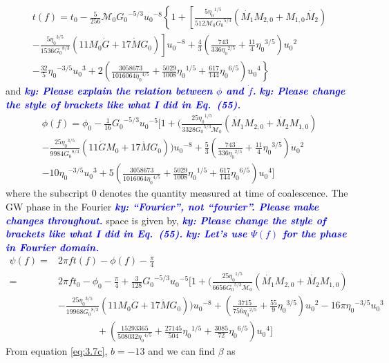 \documentclass[11pt]{article}
\newcommand{\ky}[1]{\textcolor{blue}{\it{\textbf{ky: #1}}} }
\begin{document}
\begin{align}
t(f)=t_0-\frac{5}{256}\mathcal{M}_0{G_0}^{-5/3}{u_0}^{-8}\left\{1+\left[\frac{5{\eta_0}^{1/5}}{512\mathcal{M}_0{G_0}^{5/3}}(\dot{M_1}M_{2,0}+M_{1,0}\dot{M_{2}}) \right. \right. \nonumber \\
\left. \left. -\frac{5{\eta_0}^{3/5}}{1536{G_0}^{8/3}}(11M_0\dot{G}+17\dot{M}G_0)\right]{u_0}^{-8}+\frac{4}{3}\left(\frac{743}{336{\eta_0}^{2/5}}+\frac{11}{4}{\eta_0}^{3/5} \right){u_0}^2 \right. \nonumber\\
\left. -\frac{32}{5}{\eta_0}^{-3/5}{u_0}^3+2 \left(\frac{3058673}{1016064{\eta_0}^{4/5}}+\frac{5029}{1008}{\eta_0}^{1/5}+\frac{617}{144}{\eta_0}^{6/5}\right){u_0}^4\right\}
\end{align}
and \ky{Please explain the relation between $\phi$ and $\dot f$.} \ky{Please change the style of brackets like what I did in Eq.~(55).}
\begin{align}
\phi(f)=\phi_0-\frac{1}{16}{G_0}^{-5/3}{u_0}^{-5}\bigg[1+\big(\frac{25{\eta_0}^{1/5}}{3328{G_0}^{5/3}{\mathcal{M}}_0}(\dot{M_1}M_{2,0}+\dot{M_2}M_{1,0})\nonumber\\-\frac{25{\eta_0}^{3/5}}{9984{G_0}^{8/3}}(11\dot{G}M_0+17\dot{M}G_0)\big){u_0}^{-8}+\frac{5}{3}(\frac{743}{336{\eta_0}^{2/5}}+\frac{11}{4}{\eta_0}^{3/5}){u_0}^2\nonumber\\-10{\eta_0}^{-3/5}{u_0}^3+5(\frac{3058673}{1016064{\eta_0}^{4/5}}+\frac{5029}{1008}{\eta_0}^{1/5}+\frac{617}{144}{\eta_0}^{6/5}){u_0}^4\bigg]
\end{align}
where the subscript $0$ denotes the quantity measured at time of coalescence. The GW phase in the Fourier \ky{``Fourier'', not ``fourier''. Please make changes throughout.} space is given by, \ky{Please change the style of brackets like what I did in Eq.~(55).} \ky{Let's use $\Psi (f)$ for the phase in Fourier domain.}
\begin{align}\label{eq:3.7c}
\psi(f)=&2\pi ft(f)-\phi(f)-\frac{\pi}{4}\nonumber\\
=&2\pi f t_0-\phi_0-\frac{\pi}{4}+\frac{3}{128}{G_0}^{-5/3}{u_0}^{-5}\bigg[1+\big(\frac{25{\eta_0}^{1/5}}{6656{G_0}^{5/3}{\mathcal{M}}_0}(\dot{M_1}M_{2,0}+\dot{M_2}M_{1,0})\nonumber\\&-\frac{25{\eta_0}^{3/5}}{19968{G_0}^{8/3}}(11M_0\dot{G}+17\dot{M}G_0)\big){u_0}^{-8}+(\frac{3715}{756{\eta_0}^{2/5}}+\frac{55}{9}{\eta_0}^{3/5}){u_0}^2-16\pi{\eta_0}^{-3/5}{u_0}^3 &\nonumber\\&\qquad\qquad+(\frac{15293365}{508032{\eta_0}^{4/5}}+\frac{27145}{504}{\eta_0}^{1/5}+\frac{3085}{72}{\eta_0}^{6/5}){u_0}^4\bigg]
\end{align}
\hspace*{15.5pt}From equation \eqref{eq:3.7c}, $b=-13$  and we can find $\beta$ as
\end{document}
